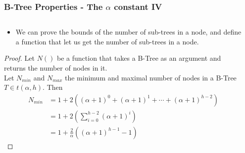 \documentclass{beamer}
\begin{document}
\begin{frame}
    \frametitle{B-Tree Properties - The \(\alpha\) constant IV}
    \begin{columns}
        \begin{column}{\textlecolumn}
            \begin{block}{}
                \vspace{-0.5cm}
                \begin{itemize}
                    \item We can prove the bounds of the number of sub-trees in a node, and define a function that let us get the number of sub-trees in a node.
                \end{itemize}
                \begin{proof}\renewcommand{\qedsymbol}{}
                    Let \(N()\) be a function that takes a B-Tree as an argument and returns the number of nodes in it.
                    \\
                    Let \(N_{min}\) and \(N_{max}\) the minimum and maximal number of nodes in a B-Tree \(T \in t\left(\alpha, h\right)\). Then
                    \[
                        \begin{aligned}
                            N_{min} &= 1 + 2\left(\left(\alpha + 1\right)^0 + \left(\alpha + 1\right)^1 + \cdots + \left(\alpha + 1\right)^{h-2} \right) \\
                            & = 1 + 2\left(\sum^{h - 2}_{i = 0} \left(\alpha + 1\right)^i \right) \\
                            & = 1 + \frac{2}{\alpha}\left(\left(\alpha + 1\right)^{h - 1} - 1\right)
                        \end{aligned}
                    \]
                \end{proof}
            \end{block}
        \end{column}
        \begin{column}{\textricolumn}
        \end{column}
    \end{columns}
\end{frame}
\end{document}
